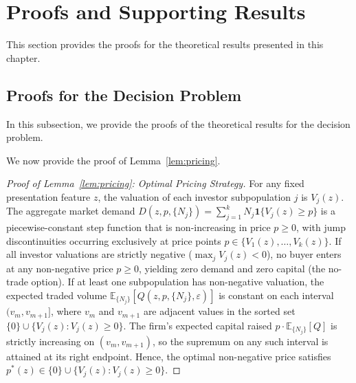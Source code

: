 \section{Proofs and Supporting Results}
\label{sec:proofs_ch5}

This section provides the proofs for the theoretical results presented in this chapter.

\subsection{Proofs for the Decision Problem}

In this subsection, we provide the proofs of the theoretical results for the decision problem.

We now provide the proof of Lemma~\ref{lem:pricing}.
\begin{proof}[Proof of Lemma~\ref{lem:pricing}: Optimal Pricing Strategy]\label{app:proof_lem_pricing}\label{proof:lem_pricing}
For any fixed presentation feature $z$, the valuation of each investor subpopulation $j$ is $V_j(z)$. The aggregate market demand $D(z, p, \{N_j\}) = \sum_{j=1}^k N_j \mathbf{1}\{V_j(z) \ge p\}$ is a piecewise-constant step function that is non-increasing in price $p \ge 0$, with jump discontinuities occurring exclusively at price points $p \in \{V_1(z), \dots, V_k(z)\}$. If all investor valuations are strictly negative ($\max_j V_j(z) < 0$), no buyer enters at any non-negative price $p \ge 0$, yielding zero demand and zero capital (the no-trade option). If at least one subpopulation has non-negative valuation, the expected traded volume $\mathbb{E}_{\{N_j\}}[Q(z, p, \{N_j\}, \varepsilon)]$ is constant on each interval $(v_m, v_{m+1}]$, where $v_m$ and $v_{m+1}$ are adjacent values in the sorted set $\{0\} \cup \{V_j(z) : V_j(z) \ge 0\}$. The firm's expected capital raised $p \cdot \mathbb{E}_{\{N_j\}}[Q]$ is strictly increasing on $(v_m, v_{m+1})$, so the supremum on any such interval is attained at its right endpoint. Hence, the optimal non-negative price satisfies $p^*(z) \in \{0\} \cup \{V_j(z) : V_j(z) \ge 0\}$.
\end{proof}

